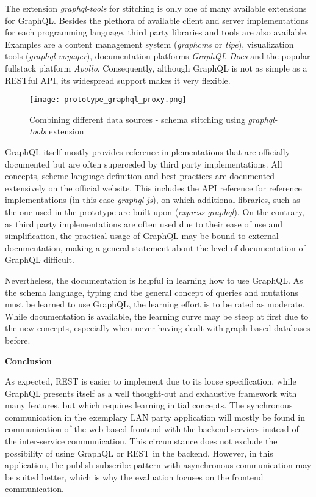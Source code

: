 The extension \textit{graphql-tools} for stitching is only one of many available extensions for GraphQL.
Besides the plethora of available client and server implementations for each programming language, third party libraries and tools are also available.
Examples are a content management system (\textit{graphcms} or \textit{tipe}), visualization tools (\textit{graphql voyager}), documentation platforms \textit{GraphQL Docs} and the popular fullstack platform \textit{Apollo}.
Consequently, although GraphQL is not as simple as a RESTful \ac{API}, its widespread support makes it very flexible.

\begin{figure}[h]
	\centering
	\texttt{[image: prototype\_graphql\_proxy.png]}
	\caption{Combining different data sources - schema stitching using \textit{graphql-tools} extension \cite{Wawhal.2018}}
	\label{img:prototypegraphqlproxy}
\end{figure}

GraphQL itself mostly provides reference implementations that are officially documented but are often superceded by third party implementations.
All concepts, scheme language definition and best practices are documented extensively on the official website.
This includes the \ac{API} reference for reference implementations (in this case \textit{graphql-js}), on which additional libraries, such as the one used in the prototype are built upon (\textit{express-graphql}).
On the contrary, as third party implementations are often used due to their ease of use and simplification, the practical usage of GraphQL may be bound to external documentation, making a general statement about the level of documentation of GraphQL difficult.

Nevertheless, the documentation is helpful in learning how to use GraphQL.
As the schema language, typing and the general concept of queries and mutations must be learned to use GraphQL, the learning effort is to be rated as moderate.
While documentation is available, the learning curve may be steep at first due to the new concepts, especially when never having dealt with graph-based databases before.

\textbf{Conclusion}

As expected, REST is easier to implement due to its loose specification, while GraphQL presents itself as a well thought-out and exhaustive framework with many features, but which requires learning initial concepts.
The synchronous communication in the exemplary LAN party application will mostly be found in communication of the web-based frontend with the backend services instead of the inter-service communication.
This circumstance does not exclude the possibility of using GraphQL or REST in the backend.
However, in this application, the publish-subscribe pattern with asynchronous communication may be suited better, which is why the evaluation focuses on the frontend communication.

